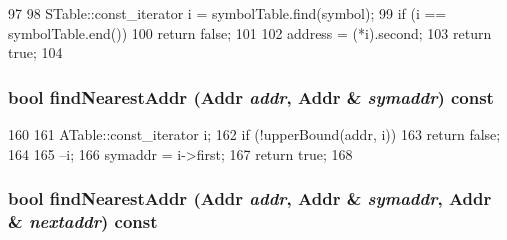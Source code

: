 \begin{DoxyCode}
97     {
98         STable::const_iterator i = symbolTable.find(symbol);
99         if (i == symbolTable.end())
100             return false;
101 
102         address = (*i).second;
103         return true;
104     }
\end{DoxyCode}
\hypertarget{classSymbolTable_ae1f88ba313684b4be515c914b7b14411}{
\subsubsection[{findNearestAddr}]{\setlength{\rightskip}{0pt plus 5cm}bool findNearestAddr ({\bf Addr} {\em addr}, \/  {\bf Addr} \& {\em symaddr}) const}}
\label{classSymbolTable_ae1f88ba313684b4be515c914b7b14411}



\begin{DoxyCode}
160     {
161         ATable::const_iterator i;
162         if (!upperBound(addr, i))
163             return false;
164 
165         --i;
166         symaddr = i->first;
167         return true;
168     }
\end{DoxyCode}
\hypertarget{classSymbolTable_a7495ab63f39dbd30ffac2d4fc219e227}{
\subsubsection[{findNearestAddr}]{\setlength{\rightskip}{0pt plus 5cm}bool findNearestAddr ({\bf Addr} {\em addr}, \/  {\bf Addr} \& {\em symaddr}, \/  {\bf Addr} \& {\em nextaddr}) const}}
\label{classSymbolTable_a7495ab63f39dbd30ffac2d4fc219e227}



